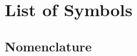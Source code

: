 \documentclass[a4paper, oneside, 11pt]{Latex/Classes/PhDthesisPSnPDF}
\begin{document}


%   



% 
%
%
%

\chapter*{List of Symbols}

\section*{Nomenclature}
\end{document}
